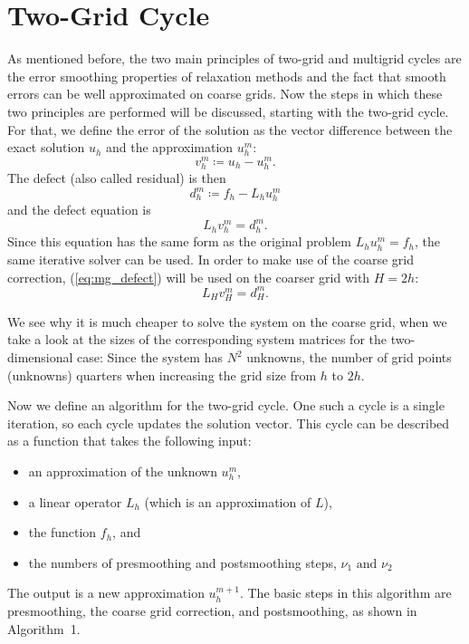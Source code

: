 \section{Two-Grid Cycle}
As mentioned before, the two main principles of two-grid and multigrid cycles are the error smoothing properties of relaxation methods and the fact that smooth errors can be well approximated on coarse grids. Now the steps in which these two principles are performed will be discussed, starting with the two-grid cycle. For that, we define the error of the solution as the vector difference between the exact solution $u_h$ and the approximation $u_h^m$:
\begin{equation}
v_h^m \coloneqq u_h - u_h^m.
\end{equation}
The defect (also called residual) is then
\begin{equation}
d_h^m \coloneqq f_h - L_h u_h^m
\end{equation}
and the defect equation is 
\begin{equation}
L_h v_h^m = d_h^m.
\label{eq:mg_defect}
\end{equation}
Since this equation has the same form as the original problem $L_hu_h^m = f_h$, the same iterative solver can be used. In order to make use of the coarse grid correction, (\ref{eq:mg_defect}) will be used on the coarser grid with $H = 2h$:
\begin{equation}
L_H v_H^m = d_H^m.
\end{equation}

We see why it is much cheaper to solve the system on the coarse grid, when we take a look at the sizes of the corresponding system matrices for the two-dimensional case: Since the system has $N^2$ unknowns, the number of grid points (unknowns) quarters when increasing the grid size from $h$ to $2h$.

Now we define an algorithm for the two-grid cycle. One such a cycle is a single iteration, so each cycle updates the solution vector. This cycle can be described as a function that takes the following input: 
\begin{itemize}
\item an approximation of the unknown $u_h^{m}$,
\item a linear operator $L_h$ (which is an approximation of $L$),
\item the function $f_h$, and
\item the numbers of presmoothing and postsmoothing steps, \(\nu_1 \textrm{ and }  \nu_2\) 
\end{itemize}
The output is a new approximation $u_h^{m+1}$. The basic steps in this algorithm are presmoothing, the coarse grid correction, and postsmoothing, as shown in Algorithm~1.

